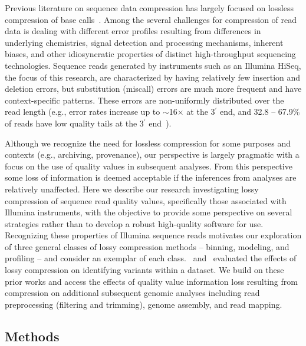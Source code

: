 \documentclass[12pt,\mydriver]{thesis}
\begin{document}
Previous literature on sequence data compression has largely focused
on lossless compression of base calls~\cite{asnani2012lossy,Canovas:2014fr,Hach:2012ys,
  janin2013adaptive,Kozanitis:2011kl,Ochoa:2013rt,Tembe:2010ys,
  Wan:2012kq,DBLP:conf/recomb/YuYB14,zhou2014compression}. Among the
several challenges for compression of read data is dealing with
different error profiles resulting from differences in underlying
chemistries, signal detection and processing mechanisms, inherent
biases, and other idiosyncratic properties of distinct high-throughput
sequencing technologies. Sequence reads generated by instruments such
as an Illumina HiSeq, the focus of this research, are characterized by
having relatively few insertion and deletion errors, but substitution
(miscall) errors are much more frequent and have context-specific
patterns. These errors are non-uniformly distributed over the read
length (e.g., error rates increase up to $\sim$16$\times$ at the
3$^{\prime}$ end, and 32.8 -- 67.9\% of reads have low quality tails
at the 3$^{\prime}$ end~\cite{Minoche:2011km}).

Although we recognize the need for lossless compression for some
purposes and contexts (e.g., archiving, provenance), our perspective
is largely pragmatic with a focus on the use of quality values in
subsequent analyses. From this perspective some loss of information is
deemed acceptable if the inferences from analyses are relatively
unaffected. Here we describe our research investigating lossy
compression of sequence read quality values, specifically those
associated with Illumina instruments, with the objective to provide
some perspective on several strategies rather than to develop a robust
high-quality software for use. Recognizing these properties of
Illumina sequence reads motivates our exploration of three general
classes of lossy compression methods -- binning, modeling, and
profiling -- and consider an exemplar of each class.~\cite{Canovas:2014fr} and~\cite{janin2013adaptive} evaluated the effects of lossy compression on identifying variants within a dataset. We build on these prior works and access the effects of
quality value information loss resulting from compression on additional
subsequent genomic analyses including read preprocessing (filtering
and trimming), genome assembly, and read mapping.

\subsection{Methods}
\end{document}

